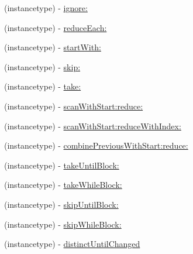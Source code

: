 \begin{DoxyCompactItemize}
\item 
(instancetype) -\/ \mbox{\hyperlink{category_r_a_c_stream_07_operations_08_aa0bf73c86006176e745390ee2b3645b2}{ignore\+:}}
\item 
(instancetype) -\/ \mbox{\hyperlink{category_r_a_c_stream_07_operations_08_aaf04bf295d943b85860ae5cc3d5851ff}{reduce\+Each\+:}}
\item 
(instancetype) -\/ \mbox{\hyperlink{category_r_a_c_stream_07_operations_08_a2f255fad695085b91a1ebc1e0a78c865}{start\+With\+:}}
\item 
(instancetype) -\/ \mbox{\hyperlink{category_r_a_c_stream_07_operations_08_a1525f1607d8ff7f04a0afc1a5193436a}{skip\+:}}
\item 
(instancetype) -\/ \mbox{\hyperlink{category_r_a_c_stream_07_operations_08_af0264b38dc4acd9334d2e42b1ce21b05}{take\+:}}
\item 
(instancetype) -\/ \mbox{\hyperlink{category_r_a_c_stream_07_operations_08_aa86990e9bc4cbc3dff2815f56b907b41}{scan\+With\+Start\+:reduce\+:}}
\item 
(instancetype) -\/ \mbox{\hyperlink{category_r_a_c_stream_07_operations_08_a69cedeb6e96a6d4154f2256fdcbe27b1}{scan\+With\+Start\+:reduce\+With\+Index\+:}}
\item 
(instancetype) -\/ \mbox{\hyperlink{category_r_a_c_stream_07_operations_08_a698f6ef68be8d3cb34f9be6efaaa5af7}{combine\+Previous\+With\+Start\+:reduce\+:}}
\item 
(instancetype) -\/ \mbox{\hyperlink{category_r_a_c_stream_07_operations_08_ac19d57150840e93112646eef310c2489}{take\+Until\+Block\+:}}
\item 
(instancetype) -\/ \mbox{\hyperlink{category_r_a_c_stream_07_operations_08_ae3b27f126fffcf5dfb8eaa6bd71c5fc4}{take\+While\+Block\+:}}
\item 
(instancetype) -\/ \mbox{\hyperlink{category_r_a_c_stream_07_operations_08_a008935d03ebc55b40b461dc080cddd38}{skip\+Until\+Block\+:}}
\item 
(instancetype) -\/ \mbox{\hyperlink{category_r_a_c_stream_07_operations_08_a1e323c308071aed5e01627d4d96ca9c8}{skip\+While\+Block\+:}}
\item 
(instancetype) -\/ \mbox{\hyperlink{category_r_a_c_stream_07_operations_08_a3af010b929b0c232ddbaa52f574fb888}{distinct\+Until\+Changed}}
\end{DoxyCompactItemize}
